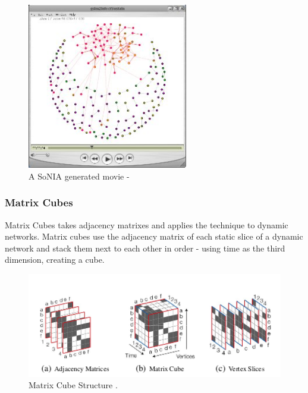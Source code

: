 \begin{figure}[H]
\begin{center}
\includegraphics[trim={0 0 0 0}, width=70mm]{./Figures/soniaPic.jpg}
\caption{A SoNIA generated movie - \cite{soniaDiagram}}
\end{center}
\end{figure}

\subsubsection*{Matrix Cubes}
Matrix Cubes \cite{vdnwmc} takes adjacency matrixes and applies the technique to dynamic networks. Matrix cubes use the adjacency matrix of each static slice of a dynamic network and stack them next to each other in order - using time as the third dimension, creating a cube. 

\begin{figure}[H]
\begin{center}
\includegraphics[trim={0 0 0 0}, width=140mm]{./Figures/networkCubePic.png}
\caption{Matrix Cube Structure \cite{vdnwmc}.}
\end{center}
\end{figure}

